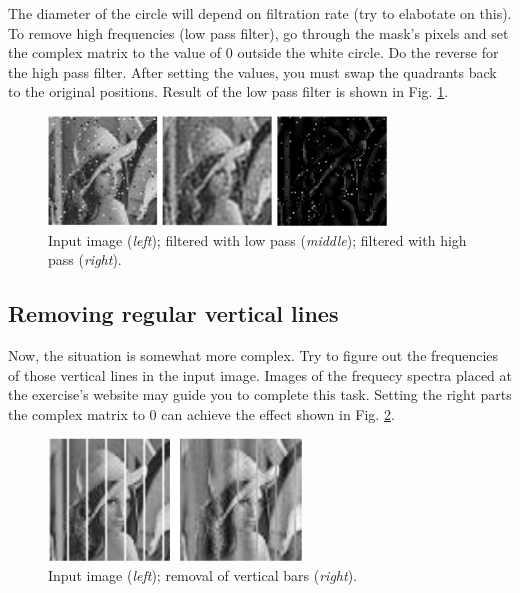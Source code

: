 \documentclass[12pt]{article}
\begin{document}
The diameter of the circle will depend on filtration rate (try to elabotate on this).
To remove high frequencies (low pass filter), go through the mask's pixels and set the complex matrix to the value of 0 outside the white circle.
Do the reverse for the high pass filter.
After setting the values, you must swap the quadrants back to the original positions.
Result of the low pass filter is shown in Fig. \ref{fig:low_high}.

\begin{figure}[h]
\centering
\includegraphics[width=0.8\textwidth]{images/lena_low_high.png}
\caption{Input image (\textit{left}); filtered with low pass (\textit{middle}); filtered with high pass (\textit{right}).}
\label{fig:low_high}
\end{figure}


\subsection*{Removing regular vertical lines}

Now, the situation is somewhat more complex.
Try to figure out the frequencies of those vertical lines in the input image.
Images of the frequecy spectra placed at the exercise's website may guide you to complete this task.
Setting the right parts the complex matrix to 0 can achieve the effect shown in Fig. \ref{fig:lena_bars_example}.

\begin{figure}[h]
\centering
\includegraphics[width=0.6\textwidth]{images/lena_bars_example.png}
\caption{Input image (\textit{left}); removal of vertical bars (\textit{right}).}
\label{fig:lena_bars_example}
\end{figure}


\end{document}
